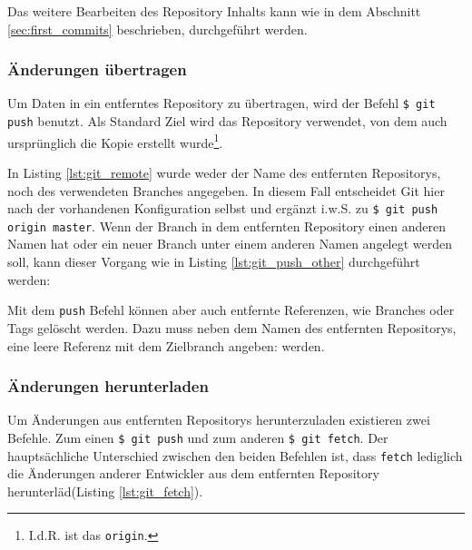 Das weitere Bearbeiten des Repository Inhalts kann wie in dem Abschnitt
\ref{sec:first_commits} beschrieben, durchgeführt werden.

\subsubsection{Änderungen übertragen}
Um Daten in ein entferntes Repository zu übertragen, wird der Befehl \texttt{\$
git push} benutzt. Als Standard Ziel wird das Repository verwendet, von dem auch
ursprünglich die Kopie erstellt wurde\footnote{I.d.R. ist das \texttt{origin}.}.



In Listing \ref{lst:git_remote} wurde weder der Name des entfernten Repositorys,
noch des verwendeten Branches angegeben. In diesem Fall entscheidet Git hier
nach der vorhandenen Konfiguration selbst und ergänzt i.w.S. zu \texttt{\$ git
push origin master}. Wenn der Branch in dem entfernten Repository einen anderen
Namen hat oder ein neuer Branch unter einem anderen Namen angelegt werden soll,
kann dieser Vorgang wie in Listing \ref{lst:git_push_other} durchgeführt werden:



Mit dem \texttt{push} Befehl können aber auch entfernte Referenzen, wie
Branches oder Tags gelöscht werden. Dazu muss neben dem Namen des entfernten
Repositorys, eine leere Referenz mit dem Zielbranch angeben:
werden.\cite[S.~153-155]{gitosp}



\subsubsection{Änderungen herunterladen}
Um Änderungen aus entfernten Repositorys herunterzuladen existieren zwei
Befehle. Zum einen \texttt{\$ git push} und zum anderen \texttt{\$ git fetch}.
Der hauptsächliche Unterschied zwischen den beiden Befehlen ist, dass
\texttt{fetch} lediglich die Änderungen anderer Entwickler aus dem entfernten
Repository herunterläd(Listing \ref{lst:git_fetch}).



